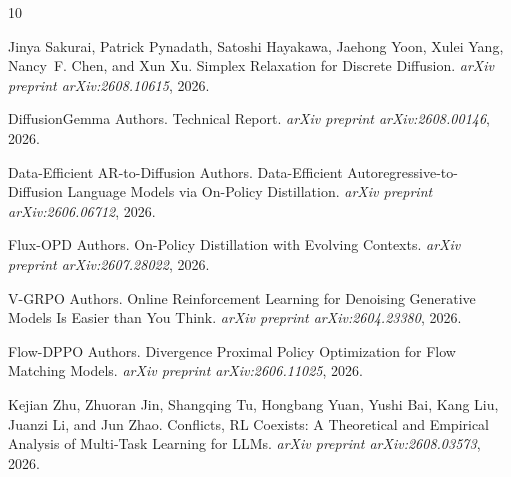 \documentclass[11pt,a4paper]{article}
\begin{document}

\begin{thebibliography}{10}

Jinya Sakurai, Patrick Pynadath, Satoshi Hayakawa, Jaehong Yoon, Xulei Yang, Nancy~F. Chen, and Xun Xu.
\newblock Simplex Relaxation for Discrete Diffusion.
\newblock \emph{arXiv preprint arXiv:2608.10615}, 2026.

{DiffusionGemma} Authors.
 Technical Report.
\newblock \emph{arXiv preprint arXiv:2608.00146}, 2026.

Data-Efficient {AR}-to-Diffusion Authors.
\newblock Data-Efficient Autoregressive-to-Diffusion Language Models via On-Policy Distillation.
\newblock \emph{arXiv preprint arXiv:2606.06712}, 2026.

Flux-{OPD} Authors.
\newblock On-Policy Distillation with Evolving Contexts.
\newblock \emph{arXiv preprint arXiv:2607.28022}, 2026.

{V-GRPO} Authors.
\newblock Online Reinforcement Learning for Denoising Generative Models Is Easier than You Think.
\newblock \emph{arXiv preprint arXiv:2604.23380}, 2026.

{Flow-DPPO} Authors.
\newblock Divergence Proximal Policy Optimization for Flow Matching Models.
\newblock \emph{arXiv preprint arXiv:2606.11025}, 2026.

Kejian Zhu, Zhuoran Jin, Shangqing Tu, Hongbang Yuan, Yushi Bai, Kang Liu, Juanzi Li, and Jun Zhao.
 Conflicts, {RL} Coexists: A Theoretical and Empirical Analysis of Multi-Task Learning for {LLMs}.
\newblock \emph{arXiv preprint arXiv:2608.03573}, 2026.

\end{thebibliography}
\end{document}
